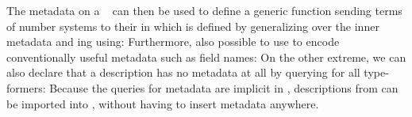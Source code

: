 The metadata on a \  can then be used to define a generic function sending terms of number systems to their  in \bN{}
which is defined by generalizing over the inner metadata and ing using:
Furthermore, also possible to use  to encode conventionally useful metadata such as field names:
On the other extreme, we can also declare that a description has no metadata at all by querying  for all type-formers:
Because the queries for metadata are implicit in , descriptions from  can be imported into , without having to insert metadata anywhere.
